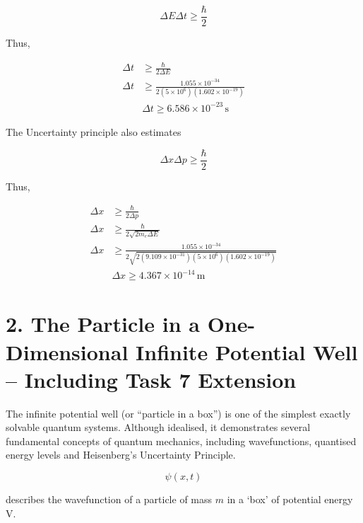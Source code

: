 \documentclass{article}
\begin{document}
\begin{equation*}
\Delta E \Delta t \geq \frac{\hbar}{2}
\end{equation*}

Thus,

\begin{align*}
\Delta t &\geq \frac{\hbar}{2 \Delta E} \\
\Delta t &\geq \frac{1.055 \times 10^{-34}}{2(5 \times 10^6)(1.602 \times 10^{-19})} \\
&\boxed{\Delta t \geq 6.586 \times 10^{-23} \,\mathrm{s}}
\end{align*}

The Uncertainty principle also estimates

\begin{equation*}
\Delta x \Delta p \geq \frac{\hbar}{2}
\end{equation*}

Thus,

\begin{align*}
\Delta x &\geq \frac{\hbar}{2 \Delta p} \\
\Delta x &\geq \frac{\hbar}{2 \sqrt{2m_e \Delta E}} \\
\Delta x &\geq \frac{1.055 \times 10^{-34}}{2 \sqrt{2(9.109 \times 10^{-31})(5 \times 10^6)(1.602 \times 10^{-19})}} \\
&\boxed{\Delta x \geq 4.367 \times 10^{-14} \,\mathrm{m}}
\end{align*}


\newpage


\section*{2. The Particle in a One-Dimensional Infinite Potential Well -- Including Task 7 Extension}

The infinite potential well (or ``particle in a box'') is one of the simplest exactly solvable quantum systems. Although idealised, it demonstrates several fundamental concepts of quantum mechanics, including wavefunctions, quantised energy levels and Heisenberg's Uncertainty Principle.

\begin{equation*}
\psi(x,t)
\end{equation*}

describes the wavefunction of a particle of mass $m$ in a `box' of potential energy V.

\vspace{1\baselineskip}
\end{document}
